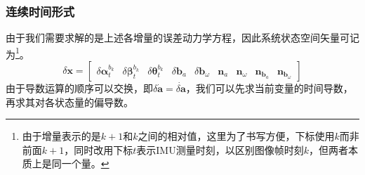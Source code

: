 \subsubsection{连续时间形式}
由于我们需要求解的是上述各增量的误差动力学方程，因此系统状态空间矢量可记为\footnote{由于增量表示的是$k+1$和$k$之间的相对值，这里为了书写方便，下标使用$k$而非前面$k+1$，同时改用下标$t$表示IMU测量时刻，以区别图像帧时刻$k$，但两者本质上是同一个量。}。
\begin{equation}
\delta\bm{x}=\left[\begin{array}{ccccccccc}
\delta\bm{\alpha}_t^{b_k} & \delta\bm{\beta}_t^{b_k} & \delta\bm{\theta}_t^{b_k} & \delta\bm{b}_a & \delta\bm{b}_\omega & \bm{n}_a & \bm{n}_\omega & \bm{n}_{\bm{b}_a} & \bm{n}_{\bm{b}_\omega}
\end{array}\right] 
\end{equation}
由于导数运算的顺序可以交换，即$\delta\dot{\bm{a}}=\dot{\delta\bm{a}}$，我们可以先求当前变量的时间导数，再求其对各状态量的偏导数。
